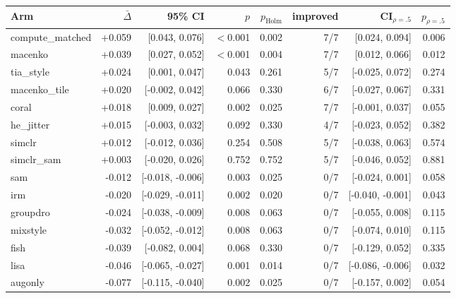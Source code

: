 \begin{tabular}{lrrrrrrr}
\toprule
Arm & $\bar\Delta$ & 95\% CI & $p$ & $p_\text{Holm}$ & improved & CI$_{\rho=.5}$ & $p_{\rho=.5}$ \\
\midrule
compute\_matched & +0.059 & [0.043, 0.076] & $<$0.001 & 0.002 & 7/7 & [0.024, 0.094] & 0.006 \\
macenko & +0.039 & [0.027, 0.052] & $<$0.001 & 0.004 & 7/7 & [0.012, 0.066] & 0.012 \\
tia\_style & +0.024 & [0.001, 0.047] & 0.043 & 0.261 & 5/7 & [-0.025, 0.072] & 0.274 \\
macenko\_tile & +0.020 & [-0.002, 0.042] & 0.066 & 0.330 & 6/7 & [-0.027, 0.067] & 0.331 \\
coral & +0.018 & [0.009, 0.027] & 0.002 & 0.025 & 7/7 & [-0.001, 0.037] & 0.055 \\
he\_jitter & +0.015 & [-0.003, 0.032] & 0.092 & 0.330 & 4/7 & [-0.023, 0.052] & 0.382 \\
simclr & +0.012 & [-0.012, 0.036] & 0.254 & 0.508 & 5/7 & [-0.038, 0.063] & 0.574 \\
simclr\_sam & +0.003 & [-0.020, 0.026] & 0.752 & 0.752 & 5/7 & [-0.046, 0.052] & 0.881 \\
sam & -0.012 & [-0.018, -0.006] & 0.003 & 0.025 & 0/7 & [-0.024, 0.001] & 0.058 \\
irm & -0.020 & [-0.029, -0.011] & 0.002 & 0.020 & 0/7 & [-0.040, -0.001] & 0.043 \\
groupdro & -0.024 & [-0.038, -0.009] & 0.008 & 0.063 & 0/7 & [-0.055, 0.008] & 0.115 \\
mixstyle & -0.032 & [-0.052, -0.012] & 0.008 & 0.063 & 0/7 & [-0.074, 0.010] & 0.115 \\
fish & -0.039 & [-0.082, 0.004] & 0.068 & 0.330 & 0/7 & [-0.129, 0.052] & 0.335 \\
lisa & -0.046 & [-0.065, -0.027] & 0.001 & 0.014 & 0/7 & [-0.086, -0.006] & 0.032 \\
augonly & -0.077 & [-0.115, -0.040] & 0.002 & 0.025 & 0/7 & [-0.157, 0.002] & 0.054 \\
\bottomrule
\end{tabular}

